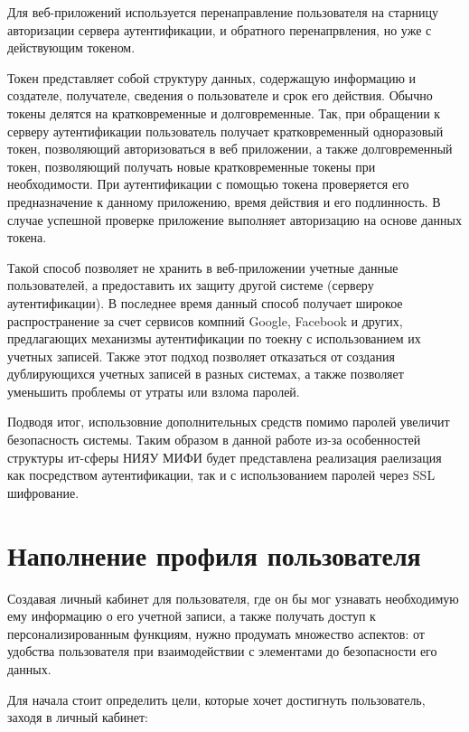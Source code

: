 Для веб-приложений используется перенаправление пользователя на старницу авторизации сервера аутентификации, и обратного перенапрвления, но уже с действующим токеном.

Токен представляет собой структуру данных, содержащую информацию и создателе, получателе, сведения о пользователе и срок его действия. Обычно токены делятся на кратковременные и долговременные. Так, при обращении к серверу аутентификации пользователь получает кратковременный одноразовый токен, позволяющий авторизоваться в веб приложении, а также долговременный токен, позволяющий получать новые кратковременные токены при необходимости. При аутентификации с помощью токена проверяется его предназначение к данному приложению, время действия и его подлинность. В случае успешной проверке приложение выполняет авторизацию на основе данных токена.

Такой способ позволяет не хранить в веб-приложении учетные данные пользователей, а предоставить их защиту другой системе (серверу аутентификации). В последнее время данный способ получает широкое распространение за счет сервисов компний Google, Facebook и других, предлагающих механизмы аутентификации по тоекну с использованием их учетных записей. Также этот подход позволяет отказаться от создания дублирующихся учетных записей в разных системах, а также позволяет уменьшить проблемы от утраты или взлома паролей.

Подводя итог, использовние дополнительных средств помимо паролей увеличит безопасность системы. Таким образом в данной работе из-за особенностей структуры ит-сферы НИЯУ МИФИ будет представлена реализация раелизация как посредством аутентификации, так и с использованием паролей через SSL шифрование.

\section{Наполнение профиля пользователя}

Создавая личный кабинет для пользователя, где он бы мог узнавать необходимую ему информацию о его учетной записи, а также получать доступ к персонализированным функциям, нужно продумать множество аспектов: от удобства пользователя при взаимодействии с элементами до безопасности его данных.

Для начала стоит определить цели, которые хочет достигнуть пользователь, заходя в личный кабинет:

